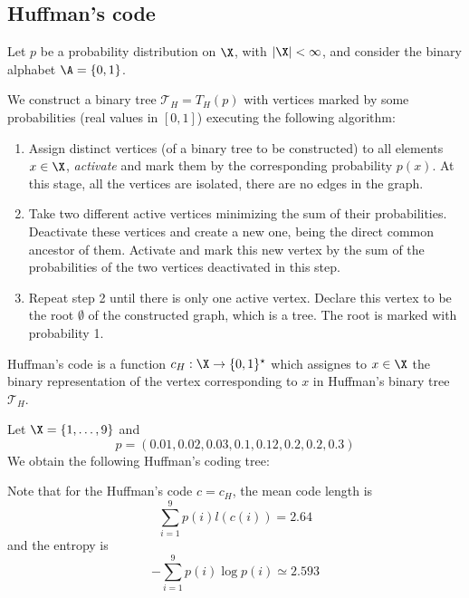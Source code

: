 \documentclass[toc]{../cs-classes/cs-classes}
\begin{document}
\subsection{Huffman's code}
Let $p$ be a probability distribution on $\X$, with $|\X|<\infty$, and consider the binary alphabet $\A=\{0, 1\}$.

\begin{definition}
    We construct a binary tree $\mathcal{T}_H = T_H(p)$ with vertices marked by some probabilities (real values in $[0, 1]$) executing the following algorithm:
    \begin{enumerate}
        \item Assign distinct vertices (of a binary tree to be constructed) to all elements $x\in\X$, \emph{activate} and mark them by the corresponding probability $p(x)$. At this stage, all the vertices are isolated, there are no edges in the graph.
        \item Take two different active vertices minimizing the sum of their probabilities. Deactivate these vertices and create a new one, being the direct common ancestor of them. Activate and mark this new vertex by the sum of the probabilities of the two vertices deactivated in this step.
        \item Repeat step 2 until there is only one active vertex. Declare this vertex to be the root $\emptyset$ of the constructed graph, which is a tree. The root is marked with probability 1.
    \end{enumerate}
\end{definition}

\begin{definition}
    Huffman's code is a function $c_H:\X\to\{0, 1\}^\star$ which assignes to $x\in\X$ the binary representation of the vertex corresponding to $x$ in Huffman's binary tree $\mathcal{T}_H$.
\end{definition}

\begin{example}
    Let $\X=\{1, \dots, 9\}$ and 
    \begin{equation*}
        p=(0.01, 0.02, 0.03, 0.1, 0.12, 0.2, 0.2, 0.3)
    \end{equation*}
    We obtain the following Huffman's coding tree:

    Note that for the Huffman's code $c=c_H$, the mean code length is
    \begin{equation*}
        \sum_{i=1}^9 p(i)l(c(i))=2.64
    \end{equation*}
    and the entropy is
    \begin{equation*}
        -\sum_{i=1}^9 p(i)\log p(i)\simeq 2.593
    \end{equation*}
\end{example}
\end{document}
